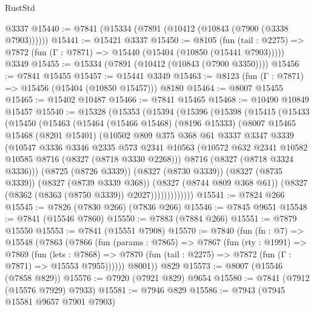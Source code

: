 \begin{lexlean}{RustStd}
\begin{coremodule}
{\begin{coremodule}
{{{{{{{{{{{{{{{{{{{{{{{{{{{{{{{{{{{{{{{{{{{{{{{{{{{{{{    @3337
@15440 := @7841 (@15334 (@7891 (@10412 (@10843 (@7900 (@3338 @7903))))))
@15441 := @15421 @3337
@15450 := @8105
    (fun (tail : @2275) => @7872 (fun (Γ : @7871) => @15440 (@15404 (@10850 (@15441 @7903)))))
    @3349
@15455 := @15334 (@7891 (@10412 (@10843 (@7900 @3350))))
@15456 := @7841 @15455
@15457 := @15441 @3349
@15463 := @8123 (fun (Γ : @7871) => @15456 (@15404 (@10850 @15457))) @8180
@15464 := @8007 @15455
@15465 := @15402 @10487
@15466 := @7841 @15465
@15468 := @10490 @10849 @15457
@15540 := @15328
    (@15353
      (@15394
        (@15396
          (@15398
            (@15415
              (@15433
                (@15450
                  (@15463
                    (@15464
                      (@15466 @15468)
                      (@8196 @15333)
                      (@8007
                        @15465
                        @15468
                        (@8201 @15401)
                        (@10502
                          @809
                          @375
                          @368
                          @61
                          @3337
                          @3347
                          @3339
                          (@10547
                            @3336
                            @3346
                            @2335
                            @573
                            @2341
                            @10563
                            (@10572 @632 @2341 @10582 @10585 @8716 (@8327 (@8718 @3330 @2268)))
                            @8716
                            (@8327 (@8718 @3324 @3336)))
                          (@8725 (@8726 @3339))
                          (@8327 (@8730 @3339))
                          (@8327 (@8735 @3339))
                          (@8327 (@8739 @3339 @368))
                          (@8327 (@8744 @809 @368 @61))
                          (@8327 (@8362 (@8363 (@8750 @3339)) @2027)))))))))))))
@15541 := @7824 @266
@15545 := @7826 (@7830 @266) (@7836 @266)
@15546 := @7845 @9651
@15548 := @7841 (@15546 @7860)
@15550 := @7883 (@7884 @266)
@15551 := @7879 @15550
@15553 := @7841 (@15551 @7908)
@15570 := @7840
    (fun (fn : @7) =>
    @15548
      (@7863
        (@7866
          (fun (params : @7865) =>
          @7867
            (fun (rty : @1991) =>
            @7869
              (fun (lets : @7868) =>
              @7870 (fun (tail : @2275) => @7872 (fun (Γ : @7871) => @15553 @7955))))))
        @8001))
    @829
@15573 := @8007 (@15546 (@7858 @829))
@15576 := @7920 (@7921 @829) @9654
@15580 := @7841 (@7912 (@15576 @7929) @7933)
@15581 := @7946 @829
@15586 := @7943 (@7945 @15581 @9657 @7901 @7903)
}}}}}}}}}}}}}}}}}}}}}}}}}}}}}}}}}}}}}}}}}}}}}}}}}}}}}}
\end{coremodule}}
\end{coremodule}
\end{lexlean}
